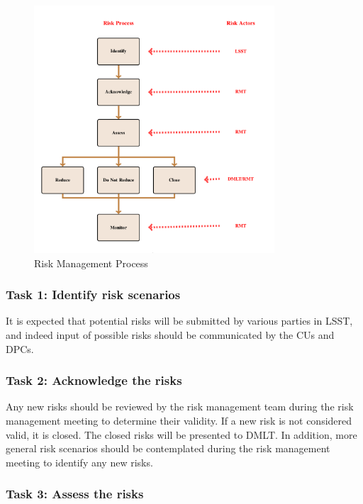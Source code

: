 \begin{figure}[H]
\begin{center}
\includegraphics[width=0.8\textwidth]{images/RiskProcess} 
\end{center}
\caption{Risk Management Process}
\label{fig:riskprocess}
\end{figure}

\subsubsection*{Task 1: Identify risk scenarios}

It is expected that potential risks will be submitted by various parties in LSST, and indeed input of possible risks should be communicated by the CUs and DPCs.

\subsubsection*{Task 2: Acknowledge the risks}
Any new risks should be reviewed by the risk management team during the risk management meeting to determine their validity. If a new risk is not considered valid, it is closed. The closed risks will be presented to DMLT.
In addition, more general risk scenarios should be contemplated during the risk management meeting to identify any new risks.

\subsubsection*{Task 3: Assess the risks}

